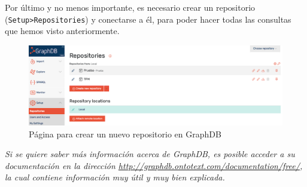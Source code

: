 Por último y no menos importante, es necesario crear un repositorio (\texttt{Setup>Repositories}) y conectarse a él, para poder hacer todas las consultas que hemos visto anteriormente.

\begin{figure}[H]
	\centering
	\includegraphics[width=1\linewidth]{imagenes/apendices/repo}
	\caption{Página para crear un nuevo repositorio en GraphDB}
	\label{fig:repo}
\end{figure}

\textit{Si se quiere saber más información acerca de GraphDB, es posible acceder a su documentación en la dirección \url{http://graphdb.ontotext.com/documentation/free/}, la cual contiene información muy útil y muy bien explicada.}



